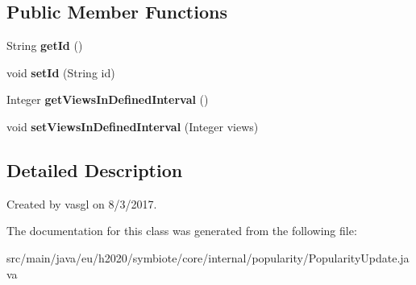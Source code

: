 \subsection*{Public Member Functions}
\begin{DoxyCompactItemize}
\item 
\mbox{\label{classeu_1_1h2020_1_1symbiote_1_1core_1_1internal_1_1popularity_1_1PopularityUpdate_ae95220bb6128f557fe0625614e8238e7}} 
String {\bfseries get\+Id} ()
\item 
\mbox{\label{classeu_1_1h2020_1_1symbiote_1_1core_1_1internal_1_1popularity_1_1PopularityUpdate_a6312c752aac3a317c3be5f9f8b1b2e23}} 
void {\bfseries set\+Id} (String id)
\item 
\mbox{\label{classeu_1_1h2020_1_1symbiote_1_1core_1_1internal_1_1popularity_1_1PopularityUpdate_a776ac8e0d0e6d4a7561595d63248cfaa}} 
Integer {\bfseries get\+Views\+In\+Defined\+Interval} ()
\item 
\mbox{\label{classeu_1_1h2020_1_1symbiote_1_1core_1_1internal_1_1popularity_1_1PopularityUpdate_aa7b785dc1e6f040acd61ea8f5dd54cb2}} 
void {\bfseries set\+Views\+In\+Defined\+Interval} (Integer views)
\end{DoxyCompactItemize}


\subsection{Detailed Description}
Created by vasgl on 8/3/2017. 

The documentation for this class was generated from the following file\+:\begin{DoxyCompactItemize}
\item 
src/main/java/eu/h2020/symbiote/core/internal/popularity/Popularity\+Update.\+java\end{DoxyCompactItemize}
